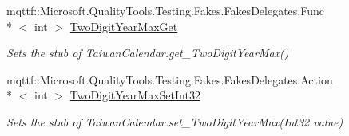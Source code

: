 \begin{DoxyCompactItemize}
mqttf\-::\-Microsoft.\-Quality\-Tools.\-Testing.\-Fakes.\-Fakes\-Delegates.\-Func\\*
$<$ int $>$ \hyperlink{class_system_1_1_globalization_1_1_fakes_1_1_stub_taiwan_calendar_a06f68f4b86b79441fc83d60adfa2e890}{Two\-Digit\-Year\-Max\-Get}
\begin{DoxyCompactList}\small\item\em Sets the stub of Taiwan\-Calendar.\-get\-\_\-\-Two\-Digit\-Year\-Max()\end{DoxyCompactList}\item 
mqttf\-::\-Microsoft.\-Quality\-Tools.\-Testing.\-Fakes.\-Fakes\-Delegates.\-Action\\*
$<$ int $>$ \hyperlink{class_system_1_1_globalization_1_1_fakes_1_1_stub_taiwan_calendar_a78a53bbcaaf9583a24087baa6027eff4}{Two\-Digit\-Year\-Max\-Set\-Int32}
\begin{DoxyCompactList}\small\item\em Sets the stub of Taiwan\-Calendar.\-set\-\_\-\-Two\-Digit\-Year\-Max(\-Int32 value)\end{DoxyCompactList}\end{DoxyCompactItemize}
